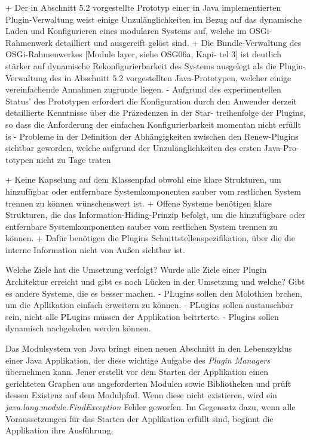 			+ Der in Abschnitt 5.2 vorgestellte Prototyp einer in Java implementierten Plugin-Verwaltung weist einige Unzulänglichkeiten im Bezug auf das dynamische Laden und Konfigurieren eines modularen Systems auf, welche im OSGi-Rahmenwerk detailliert und ausgereift gelöst sind.	 %
			+ Die Bundle-Verwaltung des OSGi-Rahmenwerkes [Module layer, siehe OSG06a, Kapi- tel 3] ist deutlich stärker auf dynamische Rekonfigurierbarkeit des Systems ausgelegt als die Plugin-Verwaltung des in Abschnitt 5.2 
			vorgestellten Java-Prototypen, welcher einige vereinfachende Annahmen zugrunde liegen. %
			- Aufgrund des experimentellen Status’ des Prototypen erfordert die Konfiguration durch den Anwender derzeit detaillierte Kenntnisse über die Präzedenzen in der Star- treihenfolge der Plugins, so dass die Anforderung der einfachen Konfigurierbarkeit momentan nicht erfüllt is
			-  Probleme in der Definition der Abhängigkeiten zwischen den Renew-Plugins sichtbar geworden, welche aufgrund der Unzulänglichkeiten des ersten Java-Pro- totypen nicht zu Tage traten

			+ Keine Kapselung auf dem Klassenpfad obwohl eine klare Strukturen, um hinzufügbar oder entfernbare Systemkomponenten sauber vom restlichen System trennen zu können wünschenswert ist. 
			+ Offene Systeme benötigen klare Strukturen, die das Information-Hiding-Prinzip befolgt, 
			 um die hinzufügbare oder entfernbare Systemkomponenten sauber vom restlichen System trennen zu können.  
			+  Dafür benötigen die Plugins Schnittstellenspezifikation, über die die interne Information nicht von Außen sichtbar ist.


			Welche Ziele hat die Umsetzung verfolgt? Wurde alle Ziele einer Plugin Architektur erreicht und gibt es noch Lücken in der Umsetzung und welche? Gibt es andere Systeme, die es besser machen. 
			- PLugins sollen den Molothien brchen, um die Apllikation einfach erweitern zu können. 
			- PLugins sollen austauschbar sein, nicht alle PLugins müssen der Applikation beitrterte.
			- Plugins sollen dynamisch nachgeladen werden können. 
			

\newpage
		Das Modulsystem von Java bringt einen neuen Abschnitt in den Lebenszyklus einer Java Applikation, der diese wichtige Aufgabe des \textit{Plugin Managers} übernehmen kann. Jener erstellt vor dem Starten der Applikation einen gerichteten Graphen aus angeforderten Modulen sowie Bibliotheken und prüft dessen Existenz auf dem Modulpfad. Wenn diese nicht existieren, wird ein \textit{java.lang.module.FindException} Fehler geworfen. Im Gegensatz dazu, wenn alle Voraussetzungen für das Starten der Applikation erfüllt sind, beginnt die Applikation ihre Ausführung. \bigbreak

